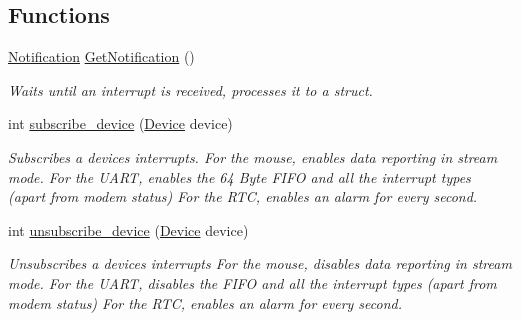 \subsection*{Functions}
\begin{DoxyCompactItemize}
\item 
\mbox{\hyperlink{struct_notification}{Notification}} \mbox{\hyperlink{group__interrupts_ga378dd2133c078d7995b6c8117739a3c5}{Get\+Notification}} ()
\begin{DoxyCompactList}\small\item\em Waits until an interrupt is received, processes it to a struct. \end{DoxyCompactList}\item 
int \mbox{\hyperlink{group__interrupts_ga52c0411fc9786e0c38241ab3584c7dd8}{subscribe\+\_\+device}} (\mbox{\hyperlink{group__interrupts_gadb53a8cc97236ca207c035241a5b7fb8}{Device}} device)
\begin{DoxyCompactList}\small\item\em Subscribes a device\textquotesingle{}s interrupts. For the mouse, enables data reporting in stream mode. For the U\+A\+RT, enables the 64 Byte F\+I\+FO and all the interrupt types (apart from modem status) For the R\+TC, enables an alarm for every second. \end{DoxyCompactList}\item 
int \mbox{\hyperlink{group__interrupts_gac34cc7680c64171b47100c01bb019ab4}{unsubscribe\+\_\+device}} (\mbox{\hyperlink{group__interrupts_gadb53a8cc97236ca207c035241a5b7fb8}{Device}} device)
\begin{DoxyCompactList}\small\item\em Unsubscribes a device\textquotesingle{}s interrupts For the mouse, disables data reporting in stream mode. For the U\+A\+RT, disables the F\+I\+FO and all the interrupt types (apart from modem status) For the R\+TC, enables an alarm for every second. \end{DoxyCompactList}\end{DoxyCompactItemize}
